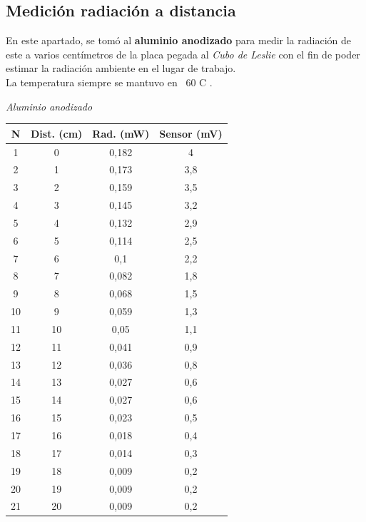 \documentclass[a4paper]{article}
\begin{document}
		\newpage
		\thispagestyle{fancy}
		
		\subsection{Medición radiación a distancia}
			\indent En este apartado, se tomó al \textbf{aluminio anodizado} para medir la radiación de este a varios centímetros de la placa pegada al \textit{Cubo de Leslie} con el fin de poder estimar la radiación ambiente en el lugar de trabajo. \\
			\indent La temperatura siempre se mantuvo en ~60 \textdegree C .\\
			
		\begin{minipage}[c]{7.5cm}
			\vspace{5mm}
			\centering
			\textit{Aluminio anodizado} 
			\vspace{2mm}
		\end{minipage}
		
		\begin{tabular}{ c  c  c  c }
			\toprule
			N \textdegree & Dist. (cm) & Rad. (mW) & Sensor (mV) \\
			\midrule
			1   &   0 & 0,182 &   4   \\
			2   &   1 & 0,173 &   3,8 \\
			3   &   2 & 0,159 &   3,5 \\
			4   &   3 & 0,145 &   3,2 \\
			5   &   4 & 0,132 &   2,9 \\
			6   &   5 & 0,114 &   2,5 \\
			7   &   6 & 0,1   &   2,2 \\
			8   &   7 & 0,082 &   1,8 \\
			9   &   8 & 0,068 &   1,5 \\
			10  &   9 & 0,059 &   1,3 \\
			11  &  10 & 0,05  &   1,1 \\
			12  &  11 & 0,041 &   0,9 \\
			13  &  12 & 0,036 &   0,8 \\
			14  &  13 & 0,027 &   0,6 \\
			15  &  14 & 0,027 &   0,6 \\
			16  &  15 & 0,023 &   0,5 \\
			17  &  16 & 0,018 &   0,4 \\
			18  &  17 & 0,014 &   0,3 \\
			19  &  18 & 0,009 &   0,2 \\
			20  &  19 & 0,009 &   0,2 \\
			21  &  20 & 0,009 &   0,2 \\
			\bottomrule
		\end{tabular}
		
\end{document}
